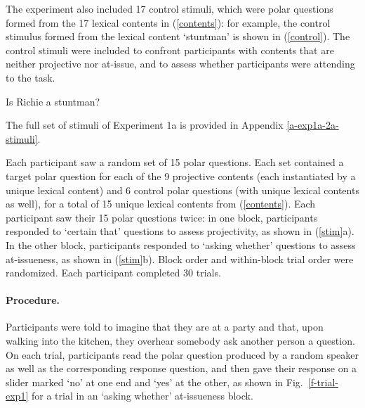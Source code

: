\documentclass[11pt,fleqn]{article}
\newcommand{\6}{\mbox{$[\hspace*{-.6mm}[$}}
\newcommand{\9}{\mbox{$]\hspace*{-.6mm}]$}}
\newcommand{\figref}[1]{Fig.~\ref{#1}}
\begin{document}
The experiment also included 17 control stimuli, which were polar questions formed from the 17 lexical contents in (\ref{contents}): for example, the control stimulus formed from the lexical content `stuntman' is shown in (\ref{control}). The control stimuli were included to confront participants with contents that are neither projective nor at-issue, and to assess whether participants were attending to the task. 

\begin{exe}
\ex\label{control} Is Richie a stuntman?
\end{exe}
The full set of stimuli of Experiment 1a is provided in Appendix \ref{a-exp1a-2a-stimuli}.

Each participant saw a random set of 15 polar questions. Each set contained a target polar question for each of the 9 projective contents (each instantiated by a unique lexical content) and 6 control polar questions (with unique lexical contents as well), for a total of 15 unique lexical contents from (\ref{contents}). Each participant saw their 15 polar questions twice: in one block, participants responded to `certain that' questions to assess projectivity, as shown in (\ref{stim}a). In the other block, participants responded to `asking whether' questions to assess at-issueness, as shown in (\ref{stim}b). Block order and within-block trial order were randomized. Each participant completed 30 trials.

\paragraph{Procedure.} Participants were told to imagine that they are at a party and that, upon walking into the kitchen, they overhear somebody ask another person a question. On each trial, participants read the polar question produced by a random speaker as well as the corresponding response question, and then gave their response on a slider marked `no' at one end and `yes' at the other, as shown in \figref{f-trial-exp1} for a trial in an `asking whether' at-issueness block.  
\end{document}
